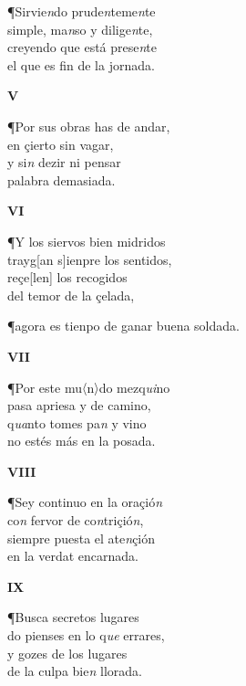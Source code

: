 \documentclass[11pt,twoside]{article}
\newcommand{\suppl}[1]{〈#1〉}
\begin{document}
\postart
¶Sirvie\emph{n}do prude\emph{n}teme\emph{n}te\\
simple, ma\emph{n}so y dilige\emph{n}te,\\
creyendo que está prese\emph{n}te\\
el que es fin de la jornada.\par
\poend
\repage
%
\begin{center}
\textbf{V}
\end{center}
\postart
¶Por sus obras has de andar,\\
en çierto sin vagar,\\
y si\emph{n} dezir ni pensar\\
palabra demasiada.\par
\poend
%
\begin{center}
\textbf{VI}
\end{center}
\postart
¶Y los siervos bien midridos\\
trayg[an s]ienpre los sentidos,\\
reçe[len] los recogidos\\
del temor de la çelada,\par
¶agora es tienpo de ganar buena soldada.\par
\poend
%
\begin{center}
\textbf{VII}
\end{center}
\postart
\noindent[f. 26r] ¶Por este mu\suppl{n}do mezq\emph{ui}no\\
pasa apriesa y de camino,\\
q\emph{ua}nto tomes pa\emph{n} y vino\\
no estés más en la posada.\par
\poend
%
\begin{center}
\textbf{VIII}
\end{center}
\postart
¶Sey continuo en la oraçió\emph{n}\\
co\emph{n} fervor de co\emph{n}triçió\emph{n},\\
siempre puesta el ate\emph{n}çión\\
en la verdat encarnada.\par
\poend
%
\begin{center}
\textbf{IX}
\end{center}
\postart
¶Busca secretos lugares\\
do pienses en lo q\emph{ue} errares,\\
y gozes de los lugares\\
de la culpa bie\emph{n} llorada.\par
\end{document}
